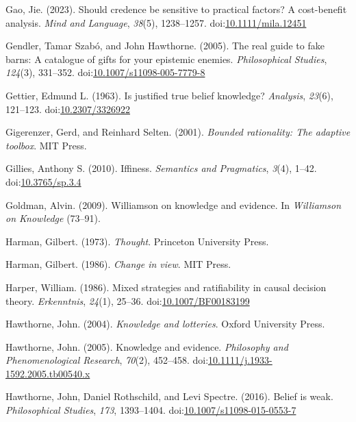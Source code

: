\documentclass[
  10pt,
  letterpaper,
  twoside]{scrbook}
\newlength{\cslhangindent}
\newenvironment{CSLReferences}[2] %
 {\begin{list}{}{%
  \setlength{\itemindent}{0pt}
  \setlength{\leftmargin}{0pt}
  \setlength{\parsep}{0pt}
  \ifodd #1
   \setlength{\leftmargin}{\cslhangindent}
   \setlength{\itemindent}{-1\cslhangindent}
  \fi
  \setlength{\itemsep}{#2\baselineskip}}}
 {\end{list}}
\begin{document}
\begin{CSLReferences}{1}{0}
Gao, Jie. (2023). Should credence be sensitive to practical factors? A
cost-benefit analysis. \emph{Mind and Language}, \emph{38}(5),
1238--1257.
doi:\href{https://doi.org/10.1111/mila.12451}{10.1111/mila.12451}

Gendler, Tamar Szabó, and John Hawthorne. (2005). The real guide to fake
barns: A catalogue of gifts for your epistemic enemies.
\emph{Philosophical Studies}, \emph{124}(3), 331--352.
doi:\href{https://doi.org/10.1007/s11098-005-7779-8}{10.1007/s11098-005-7779-8}

Gettier, Edmund L. (1963). Is justified true belief knowledge?
\emph{Analysis}, \emph{23}(6), 121--123.
doi:\href{https://doi.org/10.2307/3326922}{10.2307/3326922}

Gigerenzer, Gerd, and Reinhard Selten. (2001). \emph{Bounded
rationality: The adaptive toolbox}. MIT Press.

Gillies, Anthony S. (2010). Iffiness. \emph{Semantics and Pragmatics},
\emph{3}(4), 1--42.
doi:\href{https://doi.org/10.3765/sp.3.4}{10.3765/sp.3.4}

Goldman, Alvin. (2009). Williamson on knowledge and evidence. In
\emph{{Williamson on Knowledge}} (73--91).

Harman, Gilbert. (1973). \emph{Thought}. Princeton University Press.

Harman, Gilbert. (1986). \emph{Change in view}. {MIT} Press.

Harper, William. (1986). Mixed strategies and ratifiability in causal
decision theory. \emph{Erkenntnis}, \emph{24}(1), 25--36.
doi:\href{https://doi.org/10.1007/BF00183199}{10.1007/BF00183199}

Hawthorne, John. (2004). \emph{Knowledge and lotteries}. Oxford
University Press.

Hawthorne, John. (2005). Knowledge and evidence. \emph{Philosophy and
Phenomenological Research}, \emph{70}(2), 452--458.
doi:\href{https://doi.org/10.1111/j.1933-1592.2005.tb00540.x}{10.1111/j.1933-1592.2005.tb00540.x}

Hawthorne, John, Daniel Rothschild, and Levi Spectre. (2016). Belief is
weak. \emph{Philosophical Studies}, \emph{173}, 1393--1404.
doi:\href{https://doi.org/10.1007/s11098-015-0553-7}{10.1007/s11098-015-0553-7}


\end{CSLReferences}
\end{document}
